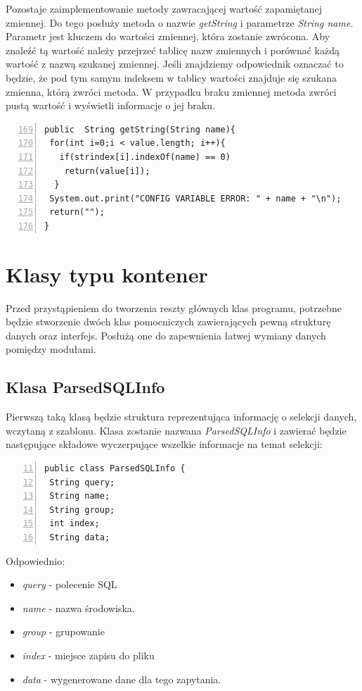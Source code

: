 Pozostaje zaimplementowanie metody zawracającej wartość zapamiętanej zmiennej. Do tego posłuży metoda o nazwie \emph{getString} i parametrze \emph{String name}. Parametr jest kluczem do wartości zmiennej, która zostanie zwrócona.  Aby znaleźć tą wartość należy przejrzeć tablicę nazw zmiennych i porównać każdą wartość z nazwą szukanej zmiennej. Jeśli znajdziemy odpowiednik oznaczać to będzie, że pod tym samym indeksem w tablicy wartości znajduje się szukana zmienna, którą zwróci metoda. W przypadku braku zmiennej metoda zwróci pustą wartość i wyświetli informacje o jej braku.

\begin{lstlisting}[numbers=left,firstnumber=169]
public  String getString(String name){
 for(int i=0;i < value.length; i++){
   if(strindex[i].indexOf(name) == 0)
    return(value[i]);
  }
 System.out.print("CONFIG VARIABLE ERROR: " + name + "\n");
 return("");
}
\end{lstlisting}

\section{Klasy typu kontener}

Przed przystąpieniem do tworzenia reszty głównych klas programu, potrzebne będzie stworzenie dwóch klas pomocniczych zawierających pewną strukturę danych oraz interfejs. Posłużą one do zapewnienia łatwej wymiany danych pomiędzy modułami. 

\subsection{Klasa ParsedSQLInfo}

Pierwszą taką klasą będzie struktura reprezentująca informację o selekcji danych, wczytaną z szablonu. Klasa zostanie nazwana \emph{ParsedSQLInfo} i zawierać będzie następujące składowe wyczerpujące wszelkie informacje na temat selekcji:

\begin{lstlisting}[numbers=left,firstnumber=11]
public class ParsedSQLInfo {
 String query;
 String name;
 String group;
 int index;
 String data;
\end{lstlisting}
Odpowiednio:
    \begin{itemize}
    \item \emph{query} - polecenie SQL
    \item \emph{name} - nazwa środowiska.
    \item \emph{group} - grupowanie
    \item \emph{index} - miejsce zapisu do pliku
    \item \emph{data} - wygenerowane dane dla tego zapytania.
    \end{itemize}

